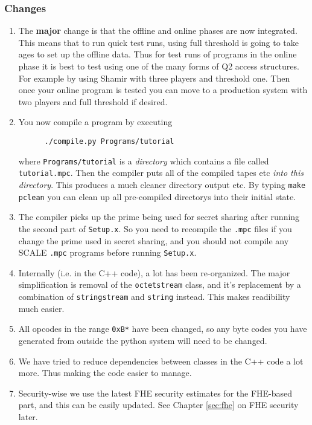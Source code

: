 \subsubsection{Changes}
\begin{enumerate}
\item The {\bf major} change is that the offline and online phases are now integrated.
This means that to run quick test runs, using full threshold is going to take
ages to set up the offline data. Thus for test runs of programs in the online
phase it is best to test using one of the many forms of Q2 access structures.
For example by using Shamir with three players and threshold one. Then once your
online program is tested you can move to a production system with two players
and full threshold if desired.
\item You now compile a program by executing
\begin{verbatim}
      ./compile.py Programs/tutorial
\end{verbatim}
where \verb+Programs/tutorial+ is a {\em directory} which contains
a file called \verb+tutorial.mpc+. Then the compiler puts all of the
compiled tapes etc {\em into this directory}.
This produces a much cleaner directory output etc.
By typing \verb+make pclean+ you can clean up all pre-compiled directorys
into their initial state.
\item The compiler picks up the prime being used for secret sharing
after running the second part of \verb+Setup.x+. So you need to recompile
the \verb+.mpc+ files if  you change the prime used in secret sharing, and you
should not compile any SCALE \verb+.mpc+ programs before running \verb+Setup.x+.
\item Internally (i.e. in the C++ code), a lot has been re-organized. The major simplification
is removal of the \verb+octetstream+ class, and it's replacement by a combination
of \verb+stringstream+ and \verb+string+ instead. This makes readibility
much easier.
\item All opcodes in the range \verb+0xB*+ have been changed, so any byte codes
you have generated from outside the python system will need to be changed.
\item We have tried to reduce dependencies between classes in the 
C++ code a lot more. Thus making the code easier to manage.
\item Security-wise we use the latest FHE security estimates for the
FHE-based part, and this can be easily updated. See Chapter \ref{sec:fhe} on FHE
security later.
\end{enumerate}


